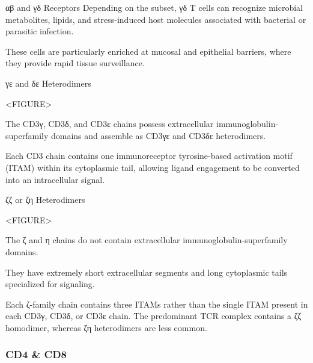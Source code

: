 \begin{core}{αβ and γδ Receptors}
        Depending on the subset, γδ T cells can recognize microbial metabolites, lipids, and stress-induced host molecules associated with bacterial or parasitic infection.

        These cells are particularly enriched at mucosal and epithelial barriers, where they provide rapid tissue surveillance.

      \end{core}

      \begin{core}{γε and δε Heterodimers}

        <FIGURE>

        The CD3γ, CD3δ, and CD3ε chains possess extracellular immunoglobulin-superfamily domains and assemble as CD3γε and CD3δε heterodimers.

        Each CD3 chain contains one immunoreceptor tyrosine-based activation motif (ITAM) within its cytoplasmic tail, allowing ligand engagement to be converted into an intracellular signal.

      \end{core}

      \begin{core}{ζζ or ζη Heterodimers}

        <FIGURE>

        The ζ and η chains do not contain extracellular immunoglobulin-superfamily domains.

        They have extremely short extracellular segments and long cytoplasmic tails specialized for signaling.

        Each ζ-family chain contains three ITAMs rather than the single ITAM present in each CD3γ, CD3δ, or CD3ε chain. The predominant TCR complex contains a ζζ homodimer, whereas ζη heterodimers are less common.

      \end{core}

    \subsubsection{CD4 \& CD8}

